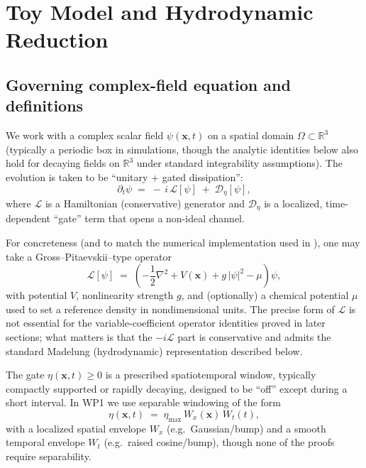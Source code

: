 \documentclass[11pt]{article}
\theoremstyle{plain}
\theoremstyle{definition}
\theoremstyle{remark}
\newcommand{\R}{\mathbb{R}}
\begin{document}
\section{Toy Model and Hydrodynamic Reduction}\label{sec:toy_model}

\subsection{Governing complex-field equation and definitions}\label{sec:toy_model_pde}
We work with a complex scalar field $\psi(\mathbf{x},t)$ on a spatial domain $\Omega\subset\R^3$ (typically a periodic box in simulations, though the analytic identities below also hold for decaying fields on $\R^3$ under standard integrability assumptions). The evolution is taken to be ``unitary + gated dissipation'':
\begin{equation}\label{eq:toy_model_split}
  \partial_t \psi
  \;=\;
  -\,i\,\mathcal{L}[\psi]
  \;+\;
  \mathcal{D}_{\eta}[\psi],
\end{equation}
where $\mathcal{L}$ is a Hamiltonian (conservative) generator and $\mathcal{D}_{\eta}$ is a localized, time-dependent ``gate'' term that opens a non-ideal channel.

For concreteness (and to match the numerical implementation used in ), one may take a Gross--Pitaevskii--type operator
\begin{equation}\label{eq:L_gp}
  \mathcal{L}[\psi]
  \;=\;
  \left(-\frac{1}{2}\nabla^2 + V(\mathbf{x}) + g\,|\psi|^2 - \mu\right)\psi,
\end{equation}
with potential $V$, nonlinearity strength $g$, and (optionally) a chemical potential $\mu$ used to set a reference density in nondimensional units. The precise form of $\mathcal{L}$ is not essential for the variable-coefficient operator identities proved in later sections; what matters is that the $-i\mathcal{L}$ part is conservative and admits the standard Madelung (hydrodynamic) representation described below.

The gate $\eta(\mathbf{x},t)\ge 0$ is a prescribed spatiotemporal window, typically compactly supported or rapidly decaying, designed to be ``off'' except during a short interval. In WP1 we use separable windowing of the form
\begin{equation}\label{eq:eta_gate_general}
  \eta(\mathbf{x},t) \;=\; \eta_{\max}\,W_x(\mathbf{x})\,W_t(t),
\end{equation}
with a localized spatial envelope $W_x$ (e.g.\ Gaussian/bump) and a smooth temporal envelope $W_t$ (e.g.\ raised cosine/bump), though none of the proofs require separability.
\end{document}
